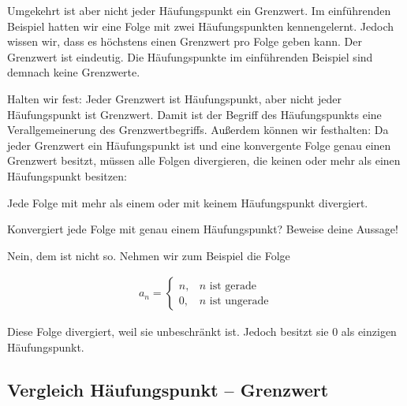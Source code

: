 \documentclass[fontsize=9pt,
               parskip=half-,
               DIV=14,
               listof=chapterentry,
               tocflat]{scrbook}
\begin{document}
Umgekehrt ist aber nicht jeder Häufungspunkt ein Grenzwert. Im einführenden Beispiel hatten wir eine Folge mit zwei Häufungspunkten kennengelernt. Jedoch wissen wir, dass es höchstens einen Grenzwert pro Folge geben kann. Der Grenzwert ist eindeutig. Die Häufungspunkte im einführenden Beispiel sind demnach keine Grenzwerte.

Halten wir fest: Jeder Grenzwert ist Häufungspunkt, aber nicht jeder Häufungspunkt ist Grenzwert. Damit ist der Begriff des Häufungspunkts eine Verallgemeinerung des Grenzwertbegriffs. Außerdem können wir festhalten: Da jeder Grenzwert ein Häufungspunkt ist und eine konvergente Folge genau einen Grenzwert besitzt, müssen alle Folgen divergieren, die keinen oder mehr als einen Häufungspunkt besitzen:

\begin{theorem*}
Jede Folge mit mehr als einem oder mit keinem Häufungspunkt divergiert.

\end{theorem*}

\begin{mdframed}[style=semanticbox,frametitleaboveskip=3pt,innerbottommargin=3pt,frametitle=Frage]
Konvergiert jede Folge mit genau einem Häufungspunkt? Beweise deine Aussage!

\end{mdframed}

\begin{answer*}
Nein, dem ist nicht so. Nehmen wir zum Beispiel die Folge

\begin{align*}
a_{n}={\begin{cases}n,&n{\text{ ist gerade}}\\0,&n{\text{ ist ungerade}}\end{cases}}
\end{align*}

Diese Folge divergiert, weil sie unbeschränkt ist. Jedoch besitzt sie 0 als einzigen Häufungspunkt.

\end{answer*}

\subsection{Vergleich Häufungspunkt – Grenzwert}


\renewcommand{\arraystretch}{1.5}
\end{document}
